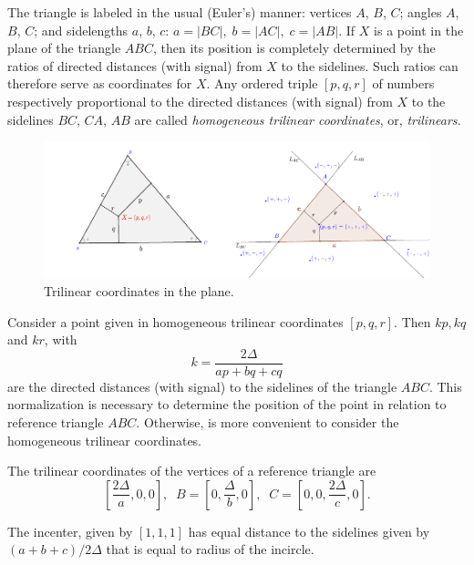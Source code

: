The triangle is labeled in the usual (Euler's) manner: vertices $A$, $B$, $C$; angles $A$, $B$, $C$;
and sidelengths $a$, $b$, $c$: $a=|BC|,\; b =|AC|,\; c =|AB|$. If $X$ is a point in the plane of
the triangle $ABC$, then its position is completely determined by the ratios of directed distances (with signal)
from $X$ to the sidelines. Such ratios can therefore serve as coordinates for $X$.
Any ordered triple $[p, q,r]$ of numbers respectively proportional to the
directed distances (with signal) from $X$ to the sidelines $BC$, $CA$, $AB$ are called {\em  homogeneous trilinear coordinates}, or,  {\em  trilinears.}

\begin{figure}
    \centering
 \includegraphics[scale=0.8]{zappA/pics/pics_appA_020_trilinear_signal.pdf}
    \caption{Trilinear coordinates in the plane.}
    \label{fig:trilinear_signal}
\end{figure}

Consider a point given in  homogeneous trilinear coordinates $[p,q,r]$.   Then   $kp,kq$ and $kr$, with
%
\[
k=\frac{2\Delta}{ap+bq+cq}
\]
are the directed distances (with signal) to the sidelines of the triangle $ABC$. This normalization is necessary  to      determine the position of the point in relation to reference triangle $ABC$. Otherwise, is more convenient to consider the homogeneous trilinear coordinates.

The trilinear coordinates of the vertices of a reference triangle are
\[ [\frac{2\Delta}{a},0,0],\;\;B=[ 
0,\frac{
	\Delta}{b} ,0],\;\; C=[
0,0,\frac{2\Delta}{c},0].
\]

The incenter, given by $[1,1,1]$ has equal distance to the sidelines given by $(a+b+c)/2\Delta$ that is equal to radius of the incircle.